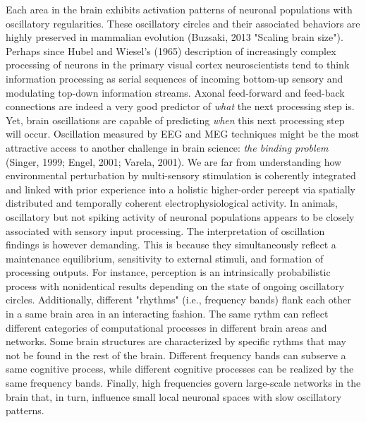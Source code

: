 \documentclass[authoryear,review,3p]{elsarticle}
\begin{document}
Each area in the brain exhibits
activation patterns of neuronal populations with
oscillatory regularities.
These oscillatory circles and their associated behaviors are
highly preserved in mammalian evolution
(Buzsaki, 2013 "Scaling brain size").
%
Perhaps since Hubel and Wiesel's (1965) description of increasingly
complex processing of neurons in the primary visual cortex
neuroscientists tend to think information processing as
serial sequences of incoming bottom-up sensory and
modulating top-down information streams.
Axonal feed-forward and feed-back connections
are indeed a very good predictor of \textit{what} the next processing step is.
Yet, brain oscillations are capable of predicting \textit{when}
this next processing step will occur.
%
Oscillation measured by EEG and MEG techniques might be the most
attractive access to another challenge in brain science:
\textit{the binding problem} (Singer, 1999; Engel, 2001; Varela, 2001).
We are far from understanding how
environmental perturbation by multi-sensory stimulation
is coherently integrated and linked with prior experience into
a holistic higher-order percept via
spatially distributed and temporally coherent electrophysiological activity.
%
In animals, oscillatory but not spiking activity of neuronal populations appears
to be closely associated with sensory input processing.
The interpretation of oscillation findings is however demanding.
This is because they
simultaneously reflect
a maintenance equilibrium, sensitivity to external stimuli, and
formation of processing outputs.
For instance,
perception is an intrinsically probabilistic process with nonidentical
results depending on the state of ongoing oscillatory circles.
Additionally,
different "rhythms" (i.e., frequency bands) flank each other
in a same brain area in an interacting fashion.
The same rythm can reflect different categories of computational processes
in different brain areas and networks. Some brain structures are
characterized by specific rythms that may not be found in the rest
of the brain.
Different frequency bands can subserve a same cognitive process, while
different cognitive processes can be realized by the same frequency bands.
%
Finally,
high frequencies govern large-scale networks in the brain that, in turn,
influence small local neuronal spaces with slow oscillatory patterns.
\end{document}
